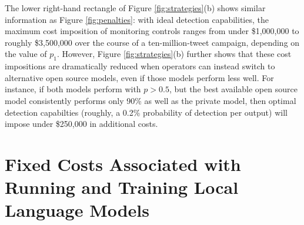 \documentclass{article}
\begin{document}
The lower right-hand rectangle of Figure \ref{fig:strategies}(b) shows similar information as Figure \ref{fig:penalties}: with ideal detection capabilities, the maximum cost imposition of monitoring controls ranges from under \$1,000,000 to roughly \$3,500,000 over the course of a ten-million-tweet campaign, depending on the value of $p_1$. However, Figure \ref{fig:strategies}(b) further shows that these cost impositions are dramatically reduced when operators can instead switch to alternative open source models, even if those models perform less well. For instance, if both models perform with $p > 0.5$, but the best available open source model consistently performs only 90\% as well as the private model, then optimal detection capabilties (roughly, a 0.2\% probability of detection per output) will impose under \$250,000 in additional costs. 

\section{Fixed Costs Associated with Running and Training Local Language Models}
\label{sec:fixedcosts}
\end{document}
